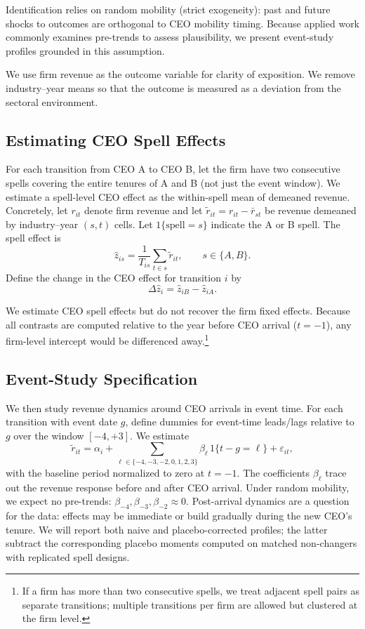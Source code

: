 \documentclass[11pt,a4paper]{article}
\begin{document}
Identification relies on random mobility (strict exogeneity): past and future shocks to outcomes are orthogonal to CEO mobility timing. Because applied work commonly examines pre-trends to assess plausibility, we present event-study profiles grounded in this assumption.

We use firm revenue as the outcome variable for clarity of exposition. We remove industry–year means so that the outcome is measured as a deviation from the sectoral environment.

\subsection*{Estimating CEO Spell Effects}
For each transition from CEO A to CEO B, let the firm have two consecutive spells covering the entire tenures of A and B (not just the event window). We estimate a spell-level CEO effect as the within-spell mean of demeaned revenue. Concretely, let \(r_{it}\) denote firm revenue and let \(\tilde r_{it}=r_{it}-\bar r_{st}\) be revenue demeaned by industry–year \((s,t)\) cells. Let \(1\{\text{spell}=s\}\) indicate the A or B spell. The spell effect is
\begin{equation}
\hat z_{is} = \frac{1}{T_{is}}\sum_{t\in s} \tilde r_{it},\qquad s\in\{A,B\}.
\end{equation}
Define the change in the CEO effect for transition \(i\) by
\begin{equation}
\Delta \hat z_i = \hat z_{iB} - \hat z_{iA}.
\end{equation}

We estimate CEO spell effects but do not recover the firm fixed effects. Because all contrasts are computed relative to the year before CEO arrival ($t=-1$), any firm-level intercept would be differenced away.\footnote{If a firm has more than two consecutive spells, we treat adjacent spell pairs as separate transitions; multiple transitions per firm are allowed but clustered at the firm level.}

\subsection*{Event-Study Specification}
We then study revenue dynamics around CEO arrivals in event time. For each transition with event date \(g\), define dummies for event-time leads/lags relative to \(g\) over the window \([-4,+3]\). We estimate
\begin{equation}
\tilde r_{it} = \alpha_i + \sum_{\ell\in\{-4,-3,-2,0,1,2,3\}} \beta_{\ell}\, 1\{t-g=\ell\} + \varepsilon_{it},
\end{equation}
with the baseline period normalized to zero at \(t=-1\). The coefficients \(\beta_{\ell}\) trace out the revenue response before and after CEO arrival. Under random mobility, we expect no pre-trends: \(\beta_{-4},\beta_{-3},\beta_{-2}\approx 0\). Post-arrival dynamics are a question for the data: effects may be immediate or build gradually during the new CEO’s tenure. We will report both naive and placebo-corrected profiles; the latter subtract the corresponding placebo moments computed on matched non-changers with replicated spell designs.
\end{document}
